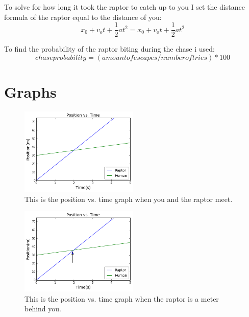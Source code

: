 \documentclass[twocolumn]{revtex4}
\begin{document}
To solve for how long it took the raptor to catch up to you I set the distance formula of the raptor equal to the distance of you:
$$ x_0 + v_ot +\frac{1}{2}at^2=x_0 + v_ot +\frac{1}{2}at^2$$


To find the probability of the raptor biting during the chase i used:
$$chase probability= (amount of escapes/number of tries) *100$$




\section{Graphs}
\begin{figure} 
   
    \includegraphics[width=0.5\textwidth]{PvsT1.png}
    \caption{This is the position vs. time graph when you and the raptor meet.\label{fig:graph}}
\end{figure}
\begin{figure} 
   
    \includegraphics[width=0.5\textwidth]{PvsT2.png}
    \caption{This is the position vs. time graph when the raptor is a meter behind you.\label{fig:graph}}
\end{figure}
\end{document}
